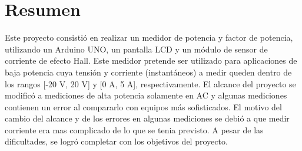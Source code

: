 \section{Resumen}

Este proyecto consistió en realizar un medidor de potencia y factor de potencia, utilizando un Arduino UNO, un pantalla LCD y un módulo de sensor de corriente de efecto Hall. Este medidor pretende ser utilizado para aplicaciones de baja potencia cuya tensión y corriente (instantáneos) a medir queden dentro de los rangos [-20 V, 20 V] y [0 A, 5 A], respectivamente. El alcance del proyecto se modificó a mediciones de alta potencia solamente en AC y algunas mediciones contienen un error al compararlo con equipos más sofisticados. El motivo del cambio del alcance y de los errores en algunas mediciones se debió a que medir corriente era mas complicado de lo que se tenia previsto. A pesar de las dificultades, se logró completar con los objetivos del proyecto. 
